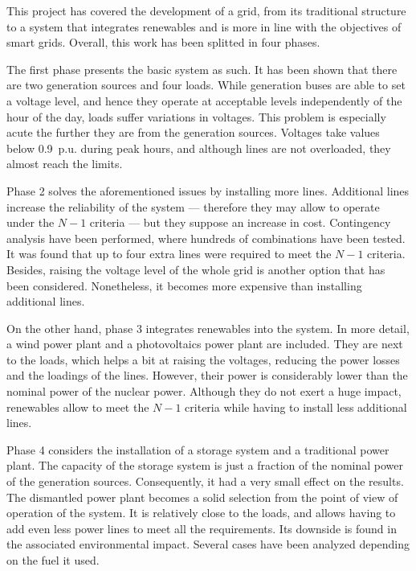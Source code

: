 This project has covered the development of a grid, from its traditional structure to a system that integrates renewables and is more in line with the objectives of smart grids. Overall, this work has been splitted in four phases.

The first phase presents the basic system as such. It has been shown that there are two generation sources and four loads. While generation buses are able to set a voltage level, and hence they operate at acceptable levels independently of the hour of the day, loads suffer variations in voltages. This problem is especially acute the further they are from the generation sources. Voltages take values below 0.9~p.u. during peak hours, and although lines are not overloaded, they almost reach the limits. 

Phase 2 solves the aforementioned issues by installing more lines. Additional lines increase the reliability of the system --- therefore they may allow to operate under the $N-1$ criteria --- but they suppose an increase in cost. Contingency analysis have been performed, where hundreds of combinations have been tested. It was found that up to four extra lines were required to meet the $N-1$ criteria. Besides, raising the voltage level of the whole grid is another option that has been considered. Nonetheless, it becomes more expensive than installing additional lines.

On the other hand, phase 3 integrates renewables into the system. In more detail, a wind power plant and a photovoltaics power plant are included. They are next to the loads, which helps a bit at raising the voltages, reducing the power losses and the loadings of the lines. However, their power is considerably lower than the nominal power of the nuclear power. Although they do not exert a huge impact, renewables allow to meet the $N-1$ criteria while having to install less additional lines.

Phase 4 considers the installation of a storage system and a traditional power plant. The capacity of the storage system is just a fraction of the nominal power of the generation sources. Consequently, it had a very small effect on the results. The dismantled power plant becomes a solid selection from the point of view of operation of the system. It is relatively close to the loads, and allows having to add even less power lines to meet all the requirements. Its downside is found in the associated environmental impact. Several cases have been analyzed depending on the fuel it used. 

